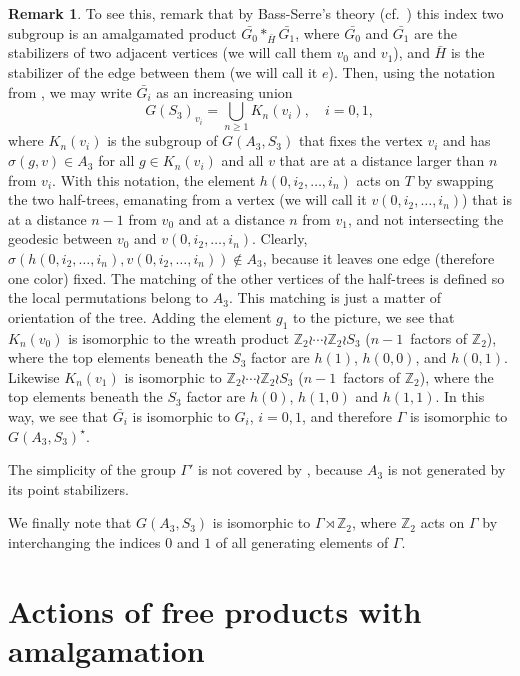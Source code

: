 \documentclass[a4paper]{amsart}
\theoremstyle{plain}
\theoremstyle{definition}
\newtheorem{remark}[theorem]{Remark}
\theoremstyle{remark}
\newcommand{\Z}{\mathbb{Z}}
\numberwithin{theorem}{section}
\begin{document}
\begin{remark}
To see this, remark that by Bass-Serre's theory (cf.\ \cite[I.4 Theorem~6]{Serre}) this index two subgroup is an amalgamated product $\bar{G_0} *_{\bar{H}} \bar{G_1}$,
where $\bar{G_0}$ and $\bar{G_1}$ are the stabilizers of two adjacent vertices (we will call them $v_0$ and $v_1$),
and $\bar{H}$ is the stabilizer of the edge between them (we will call it $e$).
Then, using the notation from \cite[Subsection~3.1]{Boudec2}, we may write $\bar{G_i}$ as an increasing union
\[
G(S_3)_{v_i} = \bigcup_{n\geq 1} K_n(v_i),\quad i=0,1,
\]
where $K_n(v_i)$ is the subgroup of $G(A_3,S_3)$ that fixes the vertex $v_i$
and has $\sigma(g,v) \in A_3$ for all $g \in K_n(v_i)$ and all $v$ that are at a distance larger than $n$ from $v_i$.
With this notation, the element $h(0,i_2, \dotsc, i_n)$ acts on $T$ by swapping the two half-trees,
emanating from a vertex (we will call it $v(0,i_2, \dotsc, i_n)$) that is at a distance $n-1$ from $v_0$ and at a distance $n$ from $v_1$,
and not intersecting the geodesic between $v_0$ and $v(0,i_2, \dotsc, i_n)$.
Clearly, $\sigma(h(0,i_2,\dotsc,i_n), v(0,i_2,\dotsc,i_n)) \notin A_3$, because it leaves one edge (therefore one color) fixed.
The matching of the other vertices of the half-trees is defined so the local permutations belong to $A_3$.
This matching is just a matter of orientation of the tree.
Adding the element $g_1$ to the picture, we see that $K_n(v_0)$ is isomorphic to the wreath product $\Z_2 \wr \dotsb \wr \Z_2 \wr S_3$ ($n-1$~factors of $\Z_2$),
where the top elements beneath the $S_3$ factor are $h(1)$, $h(0,0)$, and $h(0,1)$.
Likewise $K_n(v_1)$ is isomorphic to $\Z_2 \wr \dotsb \wr \Z_2 \wr S_3$ ($n-1$~factors of $\Z_2$),
where the top elements beneath the $S_3$ factor are $h(0)$, $h(1,0)$ and $h(1,1)$.
In this way, we see that $\bar{G_i}$ is isomorphic to $G_i$, $i=0,1$, and therefore $\Gamma$ is isomorphic to $G(A_3,S_3)^{\star}$. 

The simplicity of the group $\Gamma'$ is not covered by \cite[Corollary~4.20]{Boudec2}, because $A_3$ is not generated by its point stabilizers.

We finally note that $G(A_3,S_3)$ is isomorphic to $\Gamma \rtimes \Z_2$,
where $\Z_2$ acts on $\Gamma$ by interchanging the indices $0$ and $1$ of all generating elements of $\Gamma$.
\end{remark}

\section{Actions of free products with amalgamation}\label{sec:actions}
\end{document}
